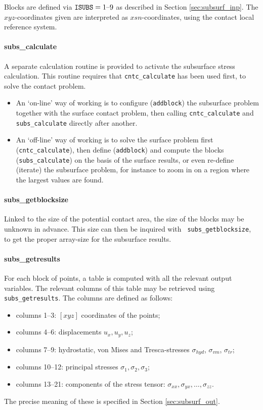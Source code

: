 \documentclass[12pt]{report}
\begin{document}
Blocks are defined via ${\tt ISUBS}=1\text{--}9$ as described in Section
\ref{sec:subsurf_inp}. The $xyz$-coordinates given are interpreted as
$xsn$-coordinates, using the contact local reference system.

\paragraph{subs\_calculate}

A separate calculation routine is provided to activate the subsurface
stress calculation. This routine requires that {\tt cntc\_calculate}
has been used first, to solve the contact problem.
\begin{itemize}
\item An `on-line' way of working is to configure ({\tt addblock}) the
        subsurface problem together with the surface contact problem, 
        then calling {\tt cntc\_calculate} and {\tt subs\_calculate} directly
        after another.
\item An `off-line' way of working is to solve the surface problem first
        ({\tt cntc\_calculate}), then define ({\tt addblock}) and compute
        the blocks ({\tt subs\_calculate}) on the basis of the surface
        results, or even re-define (iterate) the subsurface problem, for
        instance to zoom in on a region where the largest values are found.
\end{itemize}

\paragraph{subs\_getblocksize}

Linked to the size of the potential contact area, the size of the
blocks may be unknown in advance. This size can then be inquired with {\tt
subs\_getblocksize}, to get the proper array-size for the subsurface
results.

\paragraph{subs\_getresults}

For each block of points, a table is computed with all the relevant output
variables. The relevant columns of this table may be retrieved using {\tt
subs\_getresults}. The columns are defined as follows:
\begin{itemize}
\item columns 1--3: $[xyz]$ coordinates of the points;
\item columns 4--6: displacements $u_x, u_y, u_z$;
\item columns 7--9: hydrostatic, von Mises and Tresca-stresses 
        $\sigma_{hyd}$, $\sigma_{vm}$, $\sigma_{tr}$;
\item columns 10--12: principal stresses $\sigma_1, \sigma_2, \sigma_3$;
\item columns 13--21: components of the stress tensor: $\sigma_{xx},
        \sigma_{yx}, \ldots, \sigma_{zz}$.
\end{itemize}
The precise meaning of these is specified in Section \ref{sec:subsurf_out}.
\end{document}
